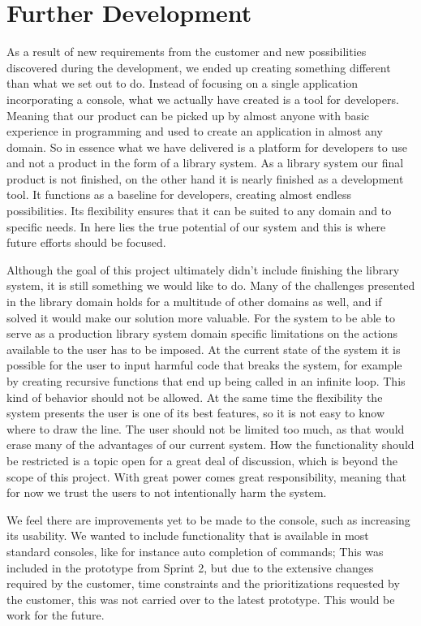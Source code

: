 \section{Further Development}
As a result of new requirements from the customer and new possibilities discovered during the development, we ended up creating something different than what we set out to do. Instead of focusing on a single application incorporating a console, what we actually have created is a tool for developers. Meaning that our product can be picked up by almost anyone with basic experience in programming and used to create an application in almost any domain. So in essence what we have delivered is a platform for developers to use and not a product in the form of a library system. As a library system our final product is not finished, on the other hand it is nearly finished as a development tool. It functions as a baseline for developers, creating almost endless possibilities. Its flexibility ensures that it can be suited to any domain and to specific needs. In here lies the true potential of our system and this is where future efforts should be focused.

Although the goal of this project ultimately didn’t include finishing the library system, it is still something we would like to do. Many of the challenges presented in the library domain holds for a multitude of other domains as well, and if solved it would make our solution more valuable. For the system to be able to serve as a production library system domain specific limitations on the actions available to the user has to be imposed. At the current state of the system it is possible for the user to input harmful code that breaks the system, for example by creating recursive functions that end up being called in an infinite loop. This kind of behavior should not be allowed. At the same time the flexibility the system presents the user is one of its best features, so it is not easy to know where to draw the line. The user should not be limited too much, as that would erase many of the advantages of our current system. How the functionality should be restricted is a topic open for a great deal of discussion, which is beyond the scope of this project. With great power comes great responsibility, meaning that for now we trust the users to not intentionally harm the system. 

We feel there are improvements yet to be made to the console, such as increasing its usability. We wanted to include functionality that is available in most standard consoles, like for instance auto completion of commands; This was included in the prototype from Sprint 2, but due to the extensive changes required by the customer, time constraints and the prioritizations requested by the customer, this was not carried over to the latest prototype. This would be work for the future.


